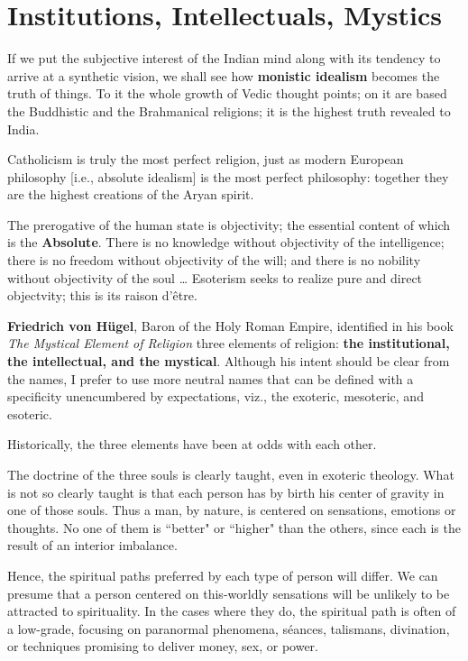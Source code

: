 \section{Institutions, Intellectuals, Mystics}

\begin{quotex}
If we put the subjective interest of the Indian mind along with its tendency to arrive at a synthetic vision, we shall see how \textbf{monistic idealism} becomes the truth of things. To it the whole growth of Vedic thought points; on it are based the Buddhistic and the Brahmanical religions; it is the highest truth revealed to India. 

Catholicism is truly the most perfect religion, just as modern European philosophy [i.e., absolute idealism] is the most perfect philosophy: together they are the highest creations of the Aryan spirit. 

The prerogative of the human state is objectivity; the essential content of which is the \textbf{Absolute}. There is no knowledge without objectivity of the intelligence; there is no freedom without objectivity of the will; and there is no nobility without objectivity of the soul … Esoterism seeks to realize pure and direct objectvity; this is its raison d'être. 

\end{quotex}
\textbf{Friedrich von Hügel}, Baron of the Holy Roman Empire, identified in his book \emph{The Mystical Element of Religion} three elements of religion: \textbf{the institutional, the intellectual, and the mystical}. Although his intent should be clear from the names, I prefer to use more neutral names that can be defined with a specificity unencumbered by expectations, viz., the exoteric, mesoteric, and esoteric.

Historically, the three elements have been at odds with each other.

The doctrine of the three souls is clearly taught, even in exoteric theology. What is not so clearly taught is that each person has by birth his center of gravity in one of those souls. Thus a man, by nature, is centered on sensations, emotions or thoughts. No one of them is ``better" or ``higher" than the others, since each is the result of an interior imbalance.

Hence, the spiritual paths preferred by each type of person will differ. We can presume that a person centered on this-worldly sensations will be unlikely to be attracted to spirituality. In the cases where they do, the spiritual path is often of a low-grade, focusing on paranormal phenomena, séances, talismans, divination, or techniques promising to deliver money, sex, or power.

